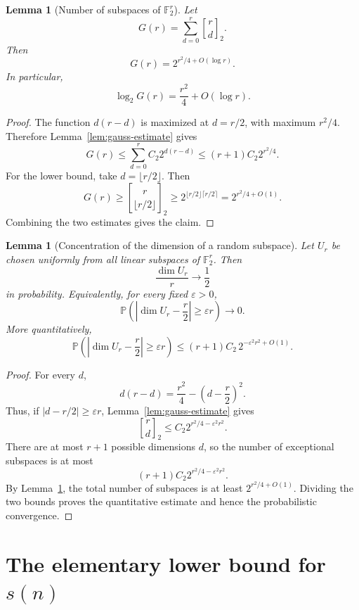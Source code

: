 \documentclass[a4paper,11pt]{amsart}
\newtheorem{lemma}[theorem]{Lemma}
\theoremstyle{remark}
\newcommand{\F}{\mathbb F}
\newcommand{\Prob}{\mathbb P}
\newcommand{\gbinom}[2]{\genfrac{[}{]}{0pt}{}{#1}{#2}_2}
\begin{document}
\begin{lemma}[Number of subspaces of \(\F_2^r\)]\label{lem:subspace-total}
Let
\[
        G(r)=\sum_{d=0}^{r}\gbinom{r}{d}.
\]
Then
\[
        G(r)=2^{r^2/4+O(\log r)}.
\]
In particular,
\[
        \log_2 G(r)=\frac{r^2}{4}+O(\log r).
\]
\end{lemma}

\begin{proof}
The function \(d(r-d)\) is maximized at \(d=r/2\), with maximum \(r^2/4\). Therefore
Lemma~\ref{lem:gauss-estimate} gives
\[
        G(r)
        \leq
        \sum_{d=0}^r C_2 2^{d(r-d)}
        \leq
        (r+1)C_2 2^{r^2/4}.
\]
For the lower bound, take \(d=\lfloor r/2\rfloor\). Then
\[
        G(r)\geq \gbinom{r}{\lfloor r/2\rfloor}
        \geq 2^{\lfloor r/2\rfloor\lceil r/2\rceil}
        =2^{r^2/4+O(1)}.
\]
Combining the two estimates gives the claim.
\end{proof}

\begin{lemma}[Concentration of the dimension of a random subspace]\label{lem:dimension-concentration}
Let \(U_r\) be chosen uniformly from all linear subspaces of \(\F_2^r\). Then
\[
        \frac{\dim U_r}{r}\to \frac12
\]
in probability. Equivalently, for every fixed \(\varepsilon>0\),
\[
        \Prob\left(\left|\dim U_r-\frac r2\right|\geq \varepsilon r\right)\to 0.
\]
More quantitatively,
\[
        \Prob\left(\left|\dim U_r-\frac r2\right|\geq \varepsilon r\right)
        \leq
        (r+1)C_2\,2^{-\varepsilon^2r^2+O(1)}.
\]
\end{lemma}

\begin{proof}
For every \(d\),
\[
        d(r-d)=\frac{r^2}{4}-\left(d-\frac r2\right)^2.
\]
Thus, if \(|d-r/2|\geq \varepsilon r\), Lemma~\ref{lem:gauss-estimate} gives
\[
        \gbinom{r}{d}\leq C_2 2^{r^2/4-\varepsilon^2r^2}.
\]
There are at most \(r+1\) possible dimensions \(d\), so the number of exceptional subspaces is at
most
\[
        (r+1)C_2 2^{r^2/4-\varepsilon^2r^2}.
\]
By Lemma~\ref{lem:subspace-total}, the total number of subspaces is at least
\(2^{r^2/4+O(1)}\). Dividing the two bounds proves the quantitative estimate and hence the
probabilistic convergence.
\end{proof}

\section{The elementary lower bound for \texorpdfstring{\(s(n)\)}{s(n)}}
\end{document}
